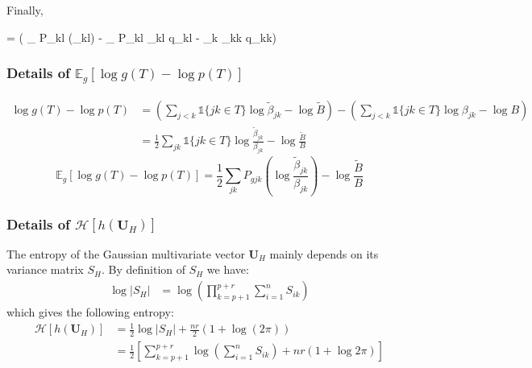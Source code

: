 \documentclass[11pt,a4paper]{article}
\newcommand*\lesswidefbox[1]{\fbox{\hspace{2em}#1\hspace{2em}}}
\newcommand{\entr}{\mathcal{H}}
\newcommand{\Ubf}{\boldsymbol{U}}
\newcommand{\Esp}{\mathds{E}}
\begin{document}
Finally, 
\begin{empheq}[box=\lesswidefbox]{align*}
\Esp_{gh} [\log p(\Ubf \mid T)] =  \Big( \sum _{} P_{kl} \log (\varphi_{kl}) - \sum_{} P_{kl} \upsilon_{kl} q_{kl} - \sum_{k} \upsilon_{kk} q_{kk}\Big)
 \end{empheq}
\subsubsection{Details of $\Esp_g[\log g(T) - \log p(T)]$}
\begin{align*}
\log g(T) - \log p(T) &= \left(  \sum_{j<k} \mathds{1}\{jk \in T\} \log \widetilde{\beta}_{jk} - \log \widetilde{B}\right) - \left(  \sum_{j<k} \mathds{1}\{jk \in T\} \log {\beta}_{jk} - \log {B}\right)\\
&=\frac{1}{2}\sum_{jk} \mathds{1}\{jk \in T\} \log \frac{\widetilde{\beta}_{jk}}{{\beta}_{jk}} - \log \frac{\widetilde{B}}{B}
\end{align*}
$$\boxed{
\Esp_g[\log g(T) - \log p(T)] = \frac{1}{2}\sum_{jk}P_{gjk} \left(\log \frac{\widetilde{\beta}_{jk}}{{\beta}_{jk}}\right) - \log \frac{\widetilde{B}}{B} }$$


  \subsubsection{Details of $\entr[h(\Ubf_H)]$}
 
 The entropy of the Gaussian multivariate vector $\Ubf_H$ mainly depends on its variance matrix $S_H$. By definition of $S_H$ we have:
 \begin{align*}
 \log |S_H| &= \log(\prod_{k=p+1}^{p+r} \sum_{i=1}^n S_{ik})
\end{align*}
which gives the following entropy:
\begin{align*}
\entr[h(\Ubf_H)]&= \frac{1}{2} \log |S_H| + \frac{nr}{2}(1+\log(2\pi))\\
 &=\frac{1}{2}\left[ \sum_{k=p+1}^{p+r} \log\left(\sum_{i=1}^n S_{ik}\right)+ nr(1+\log 2\pi )\right]
\end{align*}
\end{document}

